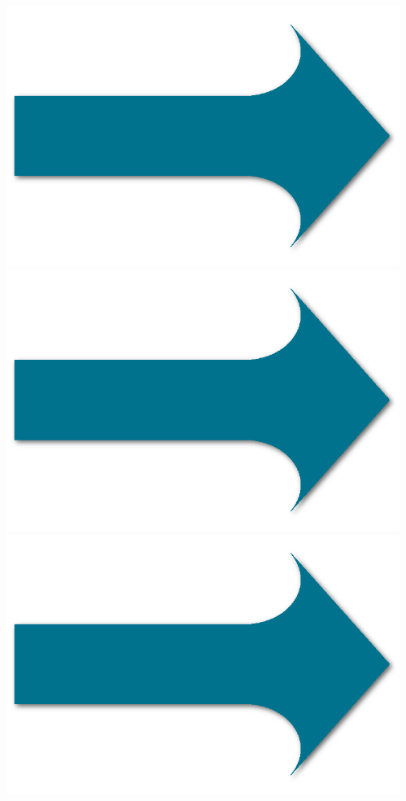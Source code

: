 \documentclass[xcolor=pdftex,dvipsnames,table]{beamer}
\begin{document}
\begin{frame}
\begin{columns}
\begin{column}{0.4\textwidth}
			\end{column}
			\begin{column}{0.05\textwidth}
				\\
				\includegraphics[width=1\textwidth]{arrow.png}\\
				\includegraphics[width=1\textwidth]{arrow.png}\\
				\includegraphics[width=1\textwidth]{arrow.png}\\

\end{column}
\end{columns}
\end{frame}
\end{document}
